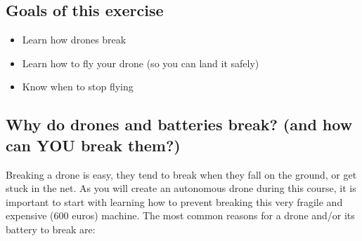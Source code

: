 \documentclass{article}
\begin{document}

\subsection*{Goals of this exercise}
\begin{itemize}
\item Learn how drones break
\item Learn how to fly your drone (so you can land it safely)
\item Know when to stop flying
\end{itemize}

\subsection*{Why do drones and batteries break? (and how can YOU break them?)}
Breaking a drone is easy, they tend to break when they fall on the ground, or get stuck in the net. As you will create an autonomous drone during this course, it is important to start with learning how to prevent breaking this very fragile and expensive (600 euros) machine. The most common reasons for a drone and/or its battery to break are:
\end{document}
